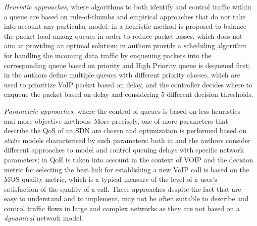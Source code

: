 \textit{Heuristic approaches}, where algorithms to both identify and control traffic within a queue are based on rule-of-thumbs and empirical approaches that do not take into account any particular model: in \cite{Boero2016} a heuristic method is proposed to balance the packet load among queues in order to reduce packet losses, which does not aim at providing an optimal solution; in \cite{Umadevi} authors provide a scheduling algorithm for handling the incoming data traffic by enqueuing packets into the corresponding queue based on priority and High Priority queue is dequeued first; in \cite{Olariu} the authors define multiple queues with different priority classes, which are used to prioritize VoIP packet based on delay, and the controller decides where to enqueue the packet based on delay and considering 5 different decision thresholds.
  
\textit{Parametric approaches}, where the control of queues is based on less heuristics and more objective methods. More precisely, one of more parameters that describe the QoS of an SDN are chosen and optimization is performed based on \textit{static} models characterised by such parameters: both in \cite{Haiyan} and \cite{ChenWang} the authors consider different approaches to model and control queuing delays with specific network parameters; in \cite{Najjar} QoE is taken into account in the context of VOIP and the decision metric for selecting the best link for establishing a new VoIP call is based on the MOS quality metric, which is a typical measure of the level of a user's satisfaction of the quality of a call. These approaches despite the fact that are easy to understand and to implement, may not be often suitable to describe and control traffic flows in large and complex networks as they are not based on a \textit{dynamical} network model.
  
